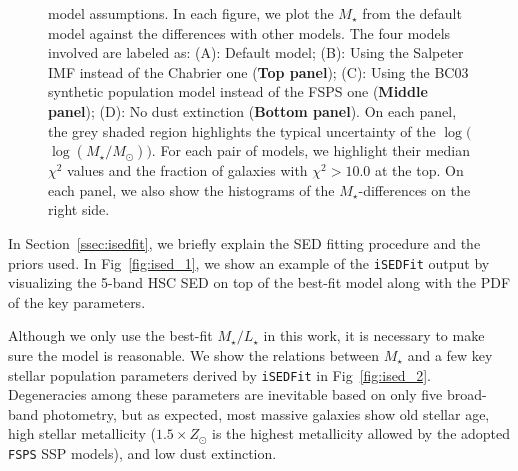 \documentclass[a4paper,fleqn,usenatbib]{mnras}
\def\mstar{{$M_{\star}$}}
\def\logms{{$\log (M_{\star}/M_{\odot})$}}
\def\m2l{{$M_{\star}/L_{\star}$}}
\begin{document}
\begin{figure}
\begin{center}
{            model assumptions. 
            In each figure, we plot the \mstar{} from the default model against the
            differences with other models. 
            The four models involved are labeled as: 
            (A): Default model; 
            (B): Using the Salpeter IMF instead of the Chabrier one 
                (\textbf{Top panel});
            (C): Using the BC03 synthetic population model instead of the FSPS one
                (\textbf{Middle panel});
            (D): No dust extinction (\textbf{Bottom panel}). 
            On each panel, the grey shaded region highlights the typical uncertainty 
            of the $\log($\logms{}$)$.            
            For each pair of models, we highlight their median $\chi^{2}$ values and 
            the fraction of galaxies with $\chi^{2} > 10.0$ at the top. 
            On each panel, we also show the histograms of the \mstar{}-differences on 
            the right side.
            }
        \label{fig:ised_3}
        \end{center}
    \end{figure}

 
    In Section~\ref{ssec:isedfit}, we briefly explain the SED fitting procedure and 
    the priors used.   
    In Fig~\ref{fig:ised_1}, we show an example of the \texttt{iSEDFit} output by 
    visualizing the 5-band HSC SED on top of the best-fit model along with the PDF 
    of the key parameters.
     
    Although we only use the best-fit \m2l{} in this work, it is necessary to make 
    sure the model is reasonable. 
    We show the relations between \mstar{} and a few key stellar population parameters 
    derived by \texttt{iSEDFit} in Fig~\ref{fig:ised_2}. 
    Degeneracies among these parameters are inevitable based on only five broad-band
    photometry, but as expected, most massive galaxies show old stellar age, high
    stellar metallicity ($1.5 \times Z_{\odot}$ is the highest metallicity allowed by 
    the adopted \texttt{FSPS} SSP models), and low dust extinction.
   
\end{document}
